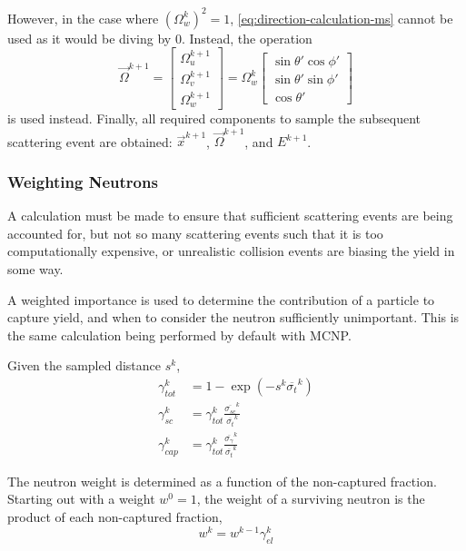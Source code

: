 However, in the case where $\left(\Omega_w^k\right)^2 = 1$, \autoref{eq:direction-calculation-ms} cannot be used as it would be diving by 0. Instead, the operation
\begin{equation}
        \overrightarrow{\Omega}^{k+1} = \begin{bmatrix}
        \Omega^{k+1}_u \\[8pt]
        \Omega^{k+1}_v \\[8pt]
        \Omega^{k+1}_w
    \end{bmatrix} = \Omega_w^k     \begin{bmatrix}
        \sin{\theta'}\cos{\phi'} \\[8pt]
        \sin{\theta'}\sin{\phi'} \\[8pt]
        \cos{\theta'}
    \end{bmatrix}
\end{equation}
is used instead. Finally, all required components to sample the subsequent scattering event are obtained: $\overrightarrow{x}^{k+1}$, $\overrightarrow{\Omega}^{k+1}$, and $E^{k+1}$.

\subsubsection{Weighting Neutrons}
\label{sec:killing-neutrons-ms}
A calculation must be made to ensure that sufficient scattering events are being accounted for, but not so many scattering events such that it is too computationally expensive, or unrealistic collision events are biasing the yield in some way.

A weighted importance is used to determine the contribution of a particle to capture yield, and when to consider the neutron sufficiently unimportant. This is the same calculation being performed by default with MCNP\cite{mcnp}. 

Given the sampled distance $s^{k}$,
\begin{align}
    \label{eq:tot-frac}
    \gamma_{tot}^{k} &=  1 - \exp{ \left(-s^{k} \overline{\sigma_{t}}^{k} \right)} \\
    \label{eq:el-frac}
    \gamma_{sc}^{k} &= \gamma_{tot}^{k} \frac{\overline{\sigma_{sc}}^{k}} {\overline{\sigma_{t}}^{k}} \\
    \label{eq:cap-frac}
    \gamma_{cap}^{k} &= \gamma_{tot}^{k} \frac{\overline{\sigma_{\gamma}}^{k}}{\overline{\sigma_{t}}^{k}}
\end{align}

The neutron weight is determined as a function of the non-captured fraction. Starting out with a weight $w^{0}=1$, the weight of a surviving neutron is the product of each non-captured fraction,
\begin{equation}
    \label{eq:neutron-weight}
    w^{k} = w^{k-1}\gamma_{el}^{k}
\end{equation}

